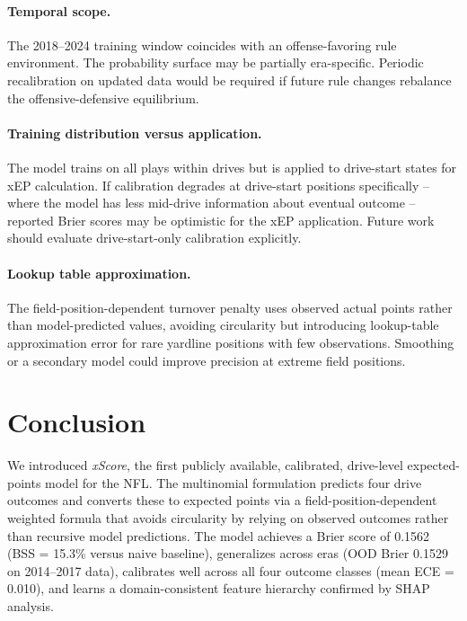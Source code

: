 \documentclass[12pt,a4paper]{article}
\newcommand{\xscore}{\textit{xScore}}
\begin{document}
\paragraph{Temporal scope.}
The 2018--2024 training window coincides with an offense-favoring rule environment. The probability surface may be partially era-specific. Periodic recalibration on updated data would be required if future rule changes rebalance the offensive-defensive equilibrium.

\paragraph{Training distribution versus application.}
The model trains on all plays within drives but is applied to drive-start states for xEP calculation. If calibration degrades at drive-start positions specifically -- where the model has less mid-drive information about eventual outcome -- reported Brier scores may be optimistic for the xEP application. Future work should evaluate drive-start-only calibration explicitly.

\paragraph{Lookup table approximation.}
The field-position-dependent turnover penalty uses observed actual points rather than model-predicted values, avoiding circularity but introducing lookup-table approximation error for rare yardline positions with few observations. Smoothing or a secondary model could improve precision at extreme field positions.

\section{Conclusion}
\label{sec:conclusion}

We introduced \xscore{}, the first publicly available, calibrated, drive-level expected-points model for the NFL. The multinomial formulation predicts four drive outcomes and converts these to expected points via a field-position-dependent weighted formula that avoids circularity by relying on observed outcomes rather than recursive model predictions. The model achieves a Brier score of 0.1562 (BSS = 15.3\% versus naive baseline), generalizes across eras (OOD Brier 0.1529 on 2014--2017 data), calibrates well across all four outcome classes (mean ECE = 0.010), and learns a domain-consistent feature hierarchy confirmed by SHAP analysis.
\end{document}
